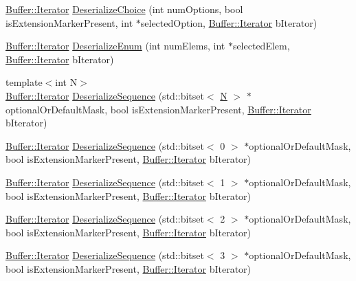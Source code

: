 \begin{DoxyCompactItemize}
\item 
\hyperlink{classns3_1_1Buffer_1_1Iterator}{Buffer\+::\+Iterator} \hyperlink{classns3_1_1Asn1Header_a0af5881f07a0549a8693a1b75c229a90}{Deserialize\+Choice} (int num\+Options, bool is\+Extension\+Marker\+Present, int $\ast$selected\+Option, \hyperlink{classns3_1_1Buffer_1_1Iterator}{Buffer\+::\+Iterator} b\+Iterator)
\item 
\hyperlink{classns3_1_1Buffer_1_1Iterator}{Buffer\+::\+Iterator} \hyperlink{classns3_1_1Asn1Header_a4fcc253e0eec3483c775b005c1875f2d}{Deserialize\+Enum} (int num\+Elems, int $\ast$selected\+Elem, \hyperlink{classns3_1_1Buffer_1_1Iterator}{Buffer\+::\+Iterator} b\+Iterator)
\item 
{\footnotesize template$<$int N$>$ }\\\hyperlink{classns3_1_1Buffer_1_1Iterator}{Buffer\+::\+Iterator} \hyperlink{classns3_1_1Asn1Header_a58c68bb97ba3fe2e8fcdd7c208d672b2}{Deserialize\+Sequence} (std\+::bitset$<$ \hyperlink{loss__ITU1238_8m_aaa6c78b1d659f53598dbe891c1139b3e}{N} $>$ $\ast$optional\+Or\+Default\+Mask, bool is\+Extension\+Marker\+Present, \hyperlink{classns3_1_1Buffer_1_1Iterator}{Buffer\+::\+Iterator} b\+Iterator)
\item 
\hyperlink{classns3_1_1Buffer_1_1Iterator}{Buffer\+::\+Iterator} \hyperlink{classns3_1_1Asn1Header_a37e31b0bad200c099ef919c381bd8768}{Deserialize\+Sequence} (std\+::bitset$<$ 0 $>$ $\ast$optional\+Or\+Default\+Mask, bool is\+Extension\+Marker\+Present, \hyperlink{classns3_1_1Buffer_1_1Iterator}{Buffer\+::\+Iterator} b\+Iterator)
\item 
\hyperlink{classns3_1_1Buffer_1_1Iterator}{Buffer\+::\+Iterator} \hyperlink{classns3_1_1Asn1Header_ad6663476e10b6338bc8b8a0fc343c523}{Deserialize\+Sequence} (std\+::bitset$<$ 1 $>$ $\ast$optional\+Or\+Default\+Mask, bool is\+Extension\+Marker\+Present, \hyperlink{classns3_1_1Buffer_1_1Iterator}{Buffer\+::\+Iterator} b\+Iterator)
\item 
\hyperlink{classns3_1_1Buffer_1_1Iterator}{Buffer\+::\+Iterator} \hyperlink{classns3_1_1Asn1Header_a1163591f15a5e18714953cf90d5e4586}{Deserialize\+Sequence} (std\+::bitset$<$ 2 $>$ $\ast$optional\+Or\+Default\+Mask, bool is\+Extension\+Marker\+Present, \hyperlink{classns3_1_1Buffer_1_1Iterator}{Buffer\+::\+Iterator} b\+Iterator)
\item 
\hyperlink{classns3_1_1Buffer_1_1Iterator}{Buffer\+::\+Iterator} \hyperlink{classns3_1_1Asn1Header_a1f6b4ed24e752ad69c0b20205609bd4a}{Deserialize\+Sequence} (std\+::bitset$<$ 3 $>$ $\ast$optional\+Or\+Default\+Mask, bool is\+Extension\+Marker\+Present, \hyperlink{classns3_1_1Buffer_1_1Iterator}{Buffer\+::\+Iterator} b\+Iterator)

\end{DoxyCompactItemize}
